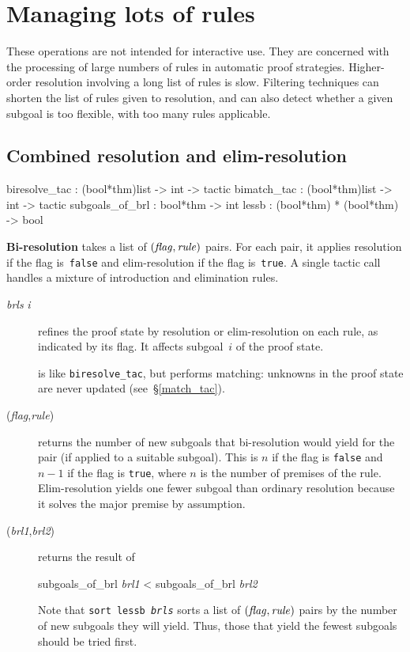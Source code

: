 \section{Managing lots of rules}
These operations are not intended for interactive use.  They are concerned
with the processing of large numbers of rules in automatic proof
strategies.  Higher-order resolution involving a long list of rules is
slow.  Filtering techniques can shorten the list of rules given to
resolution, and can also detect whether a given subgoal is too flexible,
with too many rules applicable.

\subsection{Combined resolution and elim-resolution} \label{biresolve_tac}
\begin{ttbox} 
biresolve_tac   : (bool*thm)list -> int -> tactic
bimatch_tac     : (bool*thm)list -> int -> tactic
subgoals_of_brl : bool*thm -> int
lessb           : (bool*thm) * (bool*thm) -> bool
\end{ttbox}
{\bf Bi-resolution} takes a list of $\it (flag,rule)$ pairs.  For each
pair, it applies resolution if the flag is~{\tt false} and
elim-resolution if the flag is~{\tt true}.  A single tactic call handles a
mixture of introduction and elimination rules.

\begin{description}
\item[ {\it brls} {\it i}] 
refines the proof state by resolution or elim-resolution on each rule, as
indicated by its flag.  It affects subgoal~$i$ of the proof state.

\item[] 
is like {\tt biresolve_tac}, but performs matching: unknowns in the
proof state are never updated (see~\S\ref{match_tac}).

\item[({\it flag},{\it rule})] 
returns the number of new subgoals that bi-resolution would yield for the
pair (if applied to a suitable subgoal).  This is $n$ if the flag is
{\tt false} and $n-1$ if the flag is {\tt true}, where $n$ is the number
of premises of the rule.  Elim-resolution yields one fewer subgoal than
ordinary resolution because it solves the major premise by assumption.

\item[ ({\it brl1},{\it brl2})] 
returns the result of 
\begin{ttbox}
subgoals_of_brl {\it brl1} < subgoals_of_brl {\it brl2}
\end{ttbox}
Note that \hbox{\tt sort lessb {\it brls}} sorts a list of $\it
(flag,rule)$ pairs by the number of new subgoals they will yield.  Thus,
those that yield the fewest subgoals should be tried first.
\end{description}


